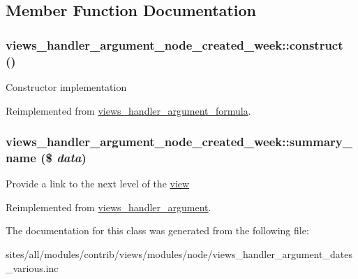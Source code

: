 \subsection{Member Function Documentation}
\hypertarget{classviews__handler__argument__node__created__week_e90c3f8a723cfa081198075d2fe67c52}{
\subsubsection[{construct}]{\setlength{\rightskip}{0pt plus 5cm}views\_\-handler\_\-argument\_\-node\_\-created\_\-week::construct ()}}
\label{classviews__handler__argument__node__created__week_e90c3f8a723cfa081198075d2fe67c52}


Constructor implementation 

Reimplemented from \hyperlink{classviews__handler__argument__formula_01284402427de2bcfa1b1da5792a2332}{views\_\-handler\_\-argument\_\-formula}.\hypertarget{classviews__handler__argument__node__created__week_12d7be7da978ed5571bb28a17b6b2805}{
\subsubsection[{summary\_\-name}]{\setlength{\rightskip}{0pt plus 5cm}views\_\-handler\_\-argument\_\-node\_\-created\_\-week::summary\_\-name (\$ {\em data})}}
\label{classviews__handler__argument__node__created__week_12d7be7da978ed5571bb28a17b6b2805}


Provide a link to the next level of the \hyperlink{classview}{view} 

Reimplemented from \hyperlink{classviews__handler__argument_4c55a340453eed4d35c69f7ac790cac1}{views\_\-handler\_\-argument}.

The documentation for this class was generated from the following file:\begin{CompactItemize}
\item 
sites/all/modules/contrib/views/modules/node/views\_\-handler\_\-argument\_\-dates\_\-various.inc\end{CompactItemize}
